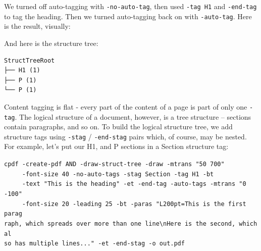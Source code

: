 \documentclass{book}
\begin{document}
\noindent We turned off auto-tagging with \texttt{-no-auto-tag}, then used \texttt{-tag H1} and \texttt{-end-tag} to tag the heading. Then we turned auto-tagging back on with \texttt{-auto-tag}. Here is the result, visually:

\bigskip
{}
\bigskip

\noindent And here is the structure tree:

\begin{verbatim}
StructTreeRoot
├── H1 (1)
├── P (1)
└── P (1)
\end{verbatim}

\noindent Content tagging is flat - every part of the content of a page is part of only one \texttt{-tag}. The logical structure of a document, however, is a tree structure -- sections contain paragraphs, and so on. To build the logical structure tree, we add structure tags using \texttt{-stag} / \texttt{-end-stag} pairs which, of course, may be nested. For example, let's put our H1, and P sections in a Section structure tag:

\begin{framed}
   \noindent\small\verb!cpdf -create-pdf AND -draw-struct-tree -draw -mtrans "50 700" !\\
   \noindent\small\verb!     -font-size 40 -no-auto-tags -stag Section -tag H1 -bt!\\
   \noindent\small\verb!     -text "This is the heading" -et -end-tag -auto-tags -mtrans "0 -100" !\\
   \noindent\small\verb!     -font-size 20 -leading 25 -bt -paras "L200pt=This is the first parag!\\
   \noindent\small\verb!raph, which spreads over more than one line\nHere is the second, which al!\\
   \noindent\small\verb!so has multiple lines..." -et -end-stag -o out.pdf!
\end{framed}
\end{document}
